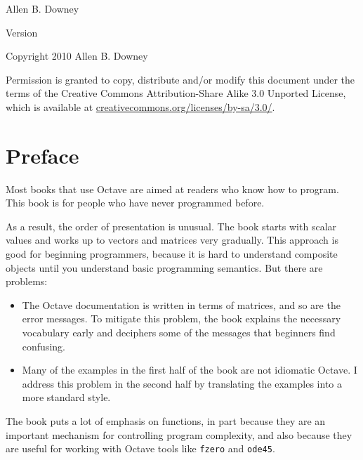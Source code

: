 \documentclass{book}
\begin{document}

\begin{htmlonly}


{\Large \thetitle}

{\large Allen B. Downey}

Version \theversion

\setcounter{chapter}{-1}

Copyright 2010 Allen B. Downey

\vspace{0.25in}

Permission is granted to copy, distribute and/or modify this document
under the terms of the Creative Commons Attribution-Share Alike 3.0
Unported License, which is available at
\url{creativecommons.org/licenses/by-sa/3.0/}.

\end{htmlonly}




\chapter*{Preface}

Most books that use Octave are aimed at readers who know how
to program. This book is for people who have never programmed
before.

As a result, the order of presentation is unusual. The book starts
with scalar values and works up to vectors and matrices very
gradually. This approach is good for beginning programmers, because
it is hard to understand composite objects until you understand basic
programming semantics. But there are problems:

\begin{itemize}

\item The Octave documentation is written in terms of matrices,
and so are the error messages.
To mitigate this problem, the book explains the necessary
vocabulary early and deciphers some of the messages that
beginners find confusing.

\item Many of the examples in the first half of the book are
not idiomatic Octave. I address this problem in the second
half by translating the examples into a more standard style.

\end{itemize}

The book puts a lot of emphasis on functions, in part because they are
an important mechanism for controlling program complexity, and also
because they are useful for working with Octave tools like {\tt fzero}
and {\tt ode45}.
\end{document}

